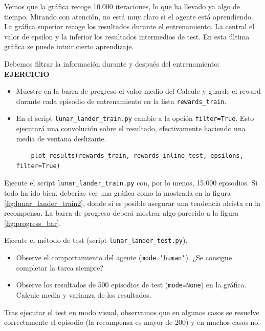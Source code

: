 \documentclass{article}
\begin{document}
Vemos que la gráfica recoge 10.000 iteraciones, lo que ha llevado ya algo de tiempo. Mirando con atención, no está muy claro si el agente está aprendiendo. La gráfica superior recoge los resultados durante el entrenamiento. La central el valor de epsilon y la inferior los resultados intermedios de test. En esta última gráfica se puede intuir cierto aprendizaje.


\begin{exercise}[breakable]
Debemos filtrar la información durante y después del entrenamiento:\\
\textbf{EJERCICIO}
\begin{itemize}
	\item Muestre en la barra de progreso el valor medio del Calcule y guarde el reward durante cada episodio de entrenamiento en la lista \texttt{rewards\_train}.
	\item En el script \texttt{lunar\_lander\_train.py} cambie a la opción \texttt{filter=True}. Esto ejecutará una convolución sobre el resultado, efectivamente haciendo una media de ventana deslizante.
	\begin{verbatim}
	plot_results(rewards_train, rewards_inline_test, epsilons, filter=True)	
	\end{verbatim}
\end{itemize}
Ejecute el script \texttt{lunar\_lander\_train.py} con, por lo menos, 15.000 episodios. Si todo ha ido bien, deberías ver una gráfica como la mostrada en la figura \ref{fig:lunar_lander_train2}, donde sí es posible asegurar una tendencia alcista en la recompensa. La barra de progreso deberá mostrar algo parecido a la figura \ref{fig:progress_bar}.
\end{exercise}

\begin{exercise}[breakable]
    Ejecute el método de test (script \texttt{lunar\_lander\_test.py}). 
\begin{itemize}
\item  Observe el comportamiento del agente (\texttt{mode='human'}). ¿Se consigue completar la tarea siempre?
\item Observe los resultados de 500 episodios de test (\texttt{mode=None}) en la gráfica. Calcule media y varianza de los resultados.
\end{itemize}    
\end{exercise}

Tras ejecutar el test en modo visual, observamos que en algunos casos se resuelve correctamente el episodio (la recompensa es mayor de 200) y en muchos casos no.
\end{document}
